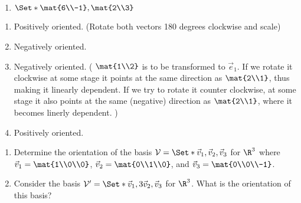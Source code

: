 \begin{exercises}
\begin{problist}
\begin{enumerate}
			\item $\Set*{\mat{6\\-1},\mat{2\\3}}$
		\end{enumerate}
		\begin{solution}
			\begin{enumerate}
				\item Positively oriented. (Rotate both vectors 180 degrees clockwise and scale)
				\item Negatively oriented.
				\item Negatively oriented. ( $\mat{1\\2}$ is to be transformed to $\vec{e}_1$. If we rotate it clockwise at some stage it points
					 at the same direction as $\mat{2\\1}$, thus making it linearly dependent. If we try to rotate it counter clockwise, at
					 some stage it also points at the same (negative) direction as $\mat{2\\1}$, where it becomes linerly dependent. )
				\item Positively oriented.
			\end{enumerate}
		\end{solution}

		\prob
		\begin{enumerate}
			\item Determine the orientation of the basis $\mathcal V
				= \Set*{\vec v_1, \vec v_2, \vec v_3}$ for $\R^{3}$
				where $\vec v_{1} = \mat{1\\0\\0}$,
				$\vec v_{2} = \mat{0\\1\\0}$, and $\vec v_{3} =
				\mat{0\\0\\-1}$.

			\item Consider the basis $\mathcal V' = \Set*{\vec v_1,
				3\vec v_2, \vec v_3}$ for $\R^{3}$. What is the
				orientation of this basis?


\end{enumerate}
\end{problist}
\end{exercises}
